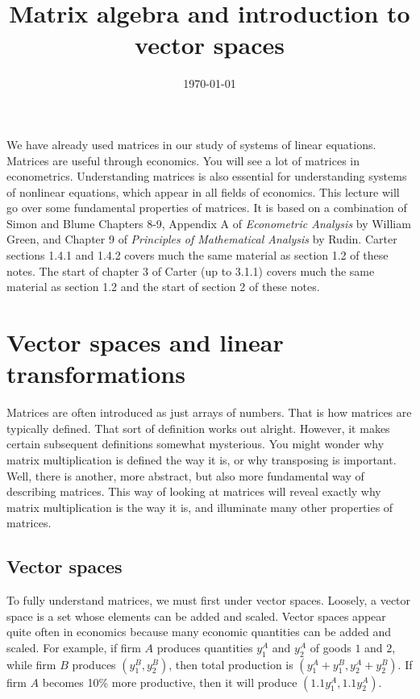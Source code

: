 \documentclass[12pt,reqno]{amsart}
\title{Matrix algebra and introduction to vector spaces}
\date{\today}
\theoremstyle{definition}
\begin{document}
\maketitle

We have already used matrices in our study of systems of linear
equations. Matrices are useful through economics. You will see a lot
of matrices in econometrics. Understanding matrices is also essential
for understanding systems of nonlinear equations, which appear in all
fields of economics. This lecture will go over some fundamental
properties of matrices. It is based on a combination of Simon and
Blume Chapters 8-9, Appendix A of \textit{Econometric Analysis} by
William Green, and Chapter 9 of \textit{Principles of Mathematical
  Analysis} by Rudin. Carter sections 1.4.1 and 1.4.2 covers much the
same material as section 1.2 of these notes. The start of chapter 3 of
Carter (up to 3.1.1) covers much the same material as section 1.2 and
the start of section 2 of these notes. 

\section{Vector spaces and linear transformations}

Matrices are often introduced as just arrays of numbers.  That is how
matrices are typically defined. That sort of definition works out
alright. However, it makes certain subsequent definitions somewhat
mysterious. You might wonder why matrix multiplication is defined the
way it is, or why transposing is important.  Well, there is another,
more abstract, but also more fundamental way of describing
matrices. This way of looking at matrices will reveal exactly why
matrix multiplication is the way it is, and illuminate many other
properties of matrices. 

\subsection{Vector spaces}

To fully understand matrices, we must first under vector
spaces. Loosely, a vector space is a set whose elements can be added
and scaled. Vector spaces appear quite often in economics because many
economic quantities can be added and scaled. For example, if firm $A$
produces quantities $y_1^A$ and $y_2^A$ of goods  $1$ and $2$, while
firm $B$ produces $(y_1^B,y_2^B)$, then total production is
$(y_1^A+y_1^B, y_2^A+y_2^B)$. If firm $A$ becomes 10\% more
productive, then it will produce $(1.1 y_1^A, 1.1 y_2^A)$. 
\end{document}
